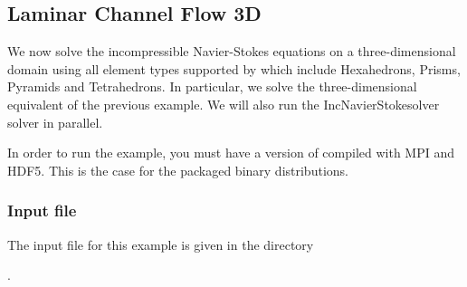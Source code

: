 \subsection{Laminar Channel Flow 3D}
We now solve the incompressible Navier-Stokes equations on a
three-dimensional domain using all element types supported by \nekpp
which include Hexahedrons, Prisms, Pyramids and Tetrahedrons. In
particular, we solve the three-dimensional equivalent of the previous
example. We will also run the IncNavierStokesolver solver in parallel.

\begin{notebox}
In order to run the example, you must have a version of \nekpp compiled with
MPI and HDF5. This is the case for the packaged binary distributions.
\end{notebox}

\subsubsection*{Input file}
The input file for this example is given in the directory

.

